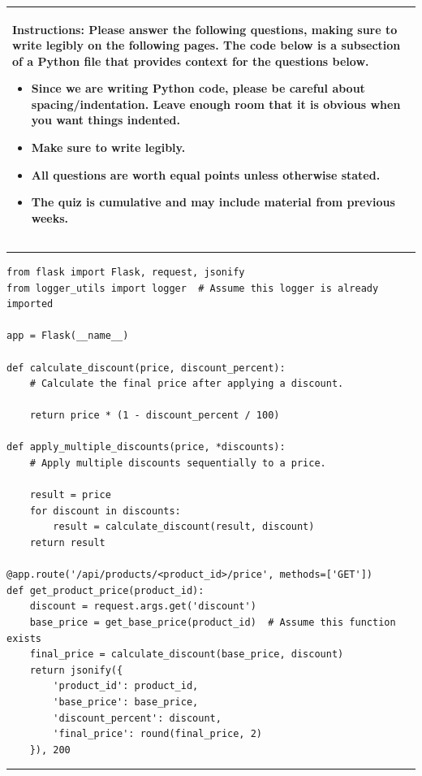 \documentclass[11pt]{article}
\begin{document}
\begin{table}[h]
\centering
{} %
\begin{tabular}{|p{\textwidth}|}
\hline
\begin{minipage}[t]{\textwidth}
\vspace{0pt}  %
\noindent \textbf{Instructions:} Please answer the following questions, making sure to write legibly on the following pages. The code below is a subsection of a Python file that provides context for the questions below.
\begin{itemize}
\item Since we are writing Python code, please be careful about spacing/indentation. Leave enough room that it is obvious when you want things indented. 
\item Make sure to write legibly.
\item All questions are worth equal points unless otherwise stated.
\item The quiz is cumulative and may include material from previous weeks.
\end{itemize}
\end{minipage} 
\\
\hline
\end{tabular}
\end{table}

{\color{lightgray}\hrule}
\begin{verbatim}
from flask import Flask, request, jsonify
from logger_utils import logger  # Assume this logger is already imported

app = Flask(__name__)

def calculate_discount(price, discount_percent):
    # Calculate the final price after applying a discount.    

    return price * (1 - discount_percent / 100)

def apply_multiple_discounts(price, *discounts):
    # Apply multiple discounts sequentially to a price.

    result = price
    for discount in discounts:
        result = calculate_discount(result, discount)
    return result

@app.route('/api/products/<product_id>/price', methods=['GET'])
def get_product_price(product_id):
    discount = request.args.get('discount')
    base_price = get_base_price(product_id)  # Assume this function exists
    final_price = calculate_discount(base_price, discount)
    return jsonify({
        'product_id': product_id,
        'base_price': base_price,
        'discount_percent': discount,
        'final_price': round(final_price, 2)
    }), 200

\end{verbatim}
{\color{lightgray}\hrule}
\end{document}

